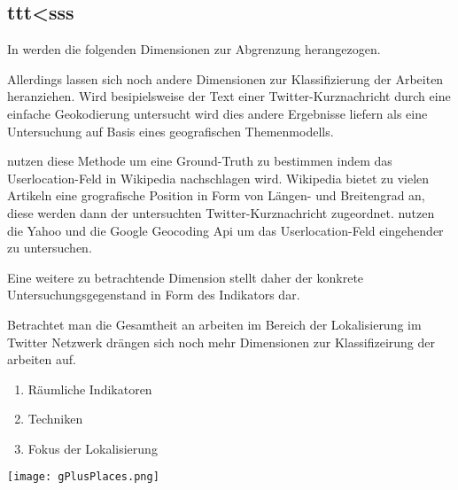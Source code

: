 		\subsection{ttt<sss}


		In \cite{Schulz2013} werden die folgenden Dimensionen zur Abgrenzung herangezogen.




		Allerdings lassen sich noch andere Dimensionen zur Klassifizierung der Arbeiten heranziehen. 
		Wird besipielsweise der Text einer Twitter-Kurznachricht durch eine einfache Geokodierung untersucht wird dies andere Ergebnisse liefern als eine Untersuchung auf Basis eines geografischen Themenmodells.  
		





		\cite{Hecht2011} nutzen diese Methode um eine Ground-Truth zu bestimmen indem das Userlocation-Feld in Wikipedia nachschlagen wird. Wikipedia bietet zu vielen Artikeln eine grografische Position in Form von Längen- und Breitengrad an, diese werden dann der untersuchten Twitter-Kurznachricht zugeordnet. 
		\cite{Hale2012} nutzen die Yahoo und die Google Geocoding Api um das Userlocation-Feld eingehender zu untersuchen.  
		

		
		Eine weitere zu betrachtende Dimension stellt daher der konkrete Untersuchungsgegenstand in Form des Indikators dar.


		Betrachtet man die Gesamtheit an arbeiten im Bereich der Lokalisierung im Twitter Netzwerk drängen sich noch mehr Dimensionen zur Klassifizeirung der arbeiten auf.

		

		\begin{enumerate}
		 	\item Räumliche Indikatoren
		 	\item Techniken
		 	\item Fokus der Lokalisierung
		 \end{enumerate} 	









\texttt{[image: gPlusPlaces.png]}

